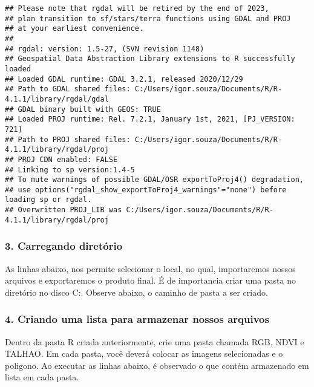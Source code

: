 \documentclass[
]{article}
\begin{document}
\begin{verbatim}
## Please note that rgdal will be retired by the end of 2023,
## plan transition to sf/stars/terra functions using GDAL and PROJ
## at your earliest convenience.
## 
## rgdal: version: 1.5-27, (SVN revision 1148)
## Geospatial Data Abstraction Library extensions to R successfully loaded
## Loaded GDAL runtime: GDAL 3.2.1, released 2020/12/29
## Path to GDAL shared files: C:/Users/igor.souza/Documents/R/R-4.1.1/library/rgdal/gdal
## GDAL binary built with GEOS: TRUE 
## Loaded PROJ runtime: Rel. 7.2.1, January 1st, 2021, [PJ_VERSION: 721]
## Path to PROJ shared files: C:/Users/igor.souza/Documents/R/R-4.1.1/library/rgdal/proj
## PROJ CDN enabled: FALSE
## Linking to sp version:1.4-5
## To mute warnings of possible GDAL/OSR exportToProj4() degradation,
## use options("rgdal_show_exportToProj4_warnings"="none") before loading sp or rgdal.
## Overwritten PROJ_LIB was C:/Users/igor.souza/Documents/R/R-4.1.1/library/rgdal/proj
\end{verbatim}

\hypertarget{carregando-diretuxf3rio}{%
\subsubsection{3. Carregando diretório}\label{carregando-diretuxf3rio}}

As linhas abaixo, nos permite selecionar o local, no qual, importaremos
nossos arquivos e exportaremos o produto final. É de importancia criar
uma pasta no diretório no disco C:. Observe abaixo, o caminho de pasta a
ser criado.

\hypertarget{criando-uma-lista-para-armazenar-nossos-arquivos}{%
\subsubsection{4. Criando uma lista para armazenar nossos
arquivos}\label{criando-uma-lista-para-armazenar-nossos-arquivos}}

Dentro da pasta R criada anteriormente, crie uma pasta chamada RGB, NDVI
e TALHAO. Em cada pasta, você deverá colocar as imagens selecionadas e o
poligono. Ao executar as linhas abaixo, é observado o que contém
armazenado em lista em cada pasta.
\end{document}
